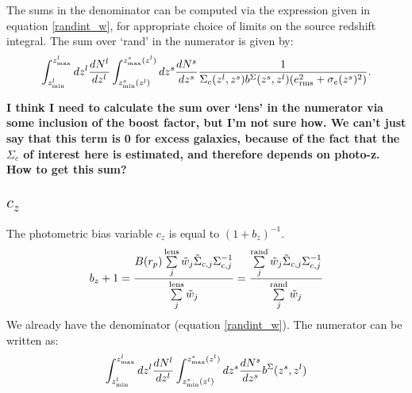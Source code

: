 \documentclass[onecolumn,amsmath,aps,fleqn, superscriptaddress]{revtex4}
\begin{document}
The sums in the denominator can be computed via the expression given in equation \ref{randint_w}, for appropriate choice of limits on the source redshift integral. The sum over `rand' in the numerator is given by:
\begin{equation}
\int_{z^l_{\rm min}}^{z^l_{\rm max}}dz^l \frac{dN^l}{dz^l} \int_{z^s_{\rm min}(z^l)}^{z^s_{\rm max}(z^l)}dz^s \frac{dN^s}{dz^s} \frac{1}{\Sigma_c(z^l , z^s) b^{\Sigma}(z^s,z^l) (e_{\rm rms}^2 + \sigma_e(z^s)^2)}.
\label{randint_wSig}
\end{equation}

{\bf I think I need to calculate the sum over `lens' in the numerator via some inclusion of the boost factor, but I'm not sure how. We can't just say that this term is 0 for excess galaxies, because of the fact that the $\Sigma_c$ of interest here is estimated, and therefore depends on photo-z. How to get this sum?}

\subsection*{$c_z$}

The photometric bias variable $c_z$ is equal to $(1+b_z)^{-1}$.
\begin{equation}
b_z+1 = \frac{B(r_p) \sum\limits^{\rm lens}_{j} \tilde{w}_j \tilde{\Sigma}_{c,j} \Sigma_{c,j}^{-1}}{\sum\limits^{\rm lens}_{j} \tilde{w}_j} = \frac{\sum\limits^{\rm rand}_{j} \tilde{w}_j \tilde{\Sigma}_{c,j} \Sigma_{c,j}^{-1}}{\sum\limits^{\rm rand}_{j} \tilde{w}_j}
\label{photozbias}
\end{equation}
We already have the denominator (equation \ref{randint_w}). The numerator can be written as:
\begin{equation}
\int_{z^l_{\rm min}}^{z^l_{\rm max}}dz^l \frac{dN^l}{dz^l} \int_{z^s_{\rm min}(z^l)}^{z^s_{\rm max}(z^l)}dz^s \frac{dN^s}{dz^s} b^\Sigma(z^s, z^l)
\label{photoz}
\end{equation}
\end{document}
